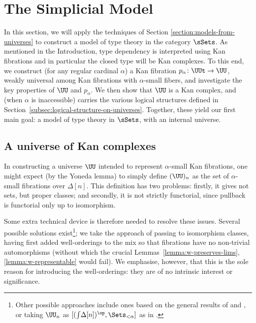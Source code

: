 \section{The Simplicial Model} \label{section:the-model}

In this section, we will apply the techniques of Section \ref{section:models-from-universes} to construct a model of type theory in the category $\sSets$. As mentioned in the Introduction, type dependency is interpreted using Kan fibrations and in particular the closed type will be Kan complexes. To this end, we construct (for any regular cardinal $\alpha$) a Kan fibration $p_\alpha \colon \UUt \to \UU$, weakly universal among Kan fibrations with $\alpha$-small fibers, and investigate the key properties of $\UU$ and $p_\alpha$. We then show that $\UU$ is a Kan complex, and (when $\alpha$ is inaccessible) carries the various logical structures defined in Section~\ref{subsec:logical-structure-on-universes}.  Together, these yield our first main goal: a model of type theory in $\sSets$, with an internal universe.

\subsection{A universe of Kan complexes} \label{subsec:representability-of-fibs}

In constructing a universe $\UU$ intended to represent $\alpha$-small Kan fibrations, one might expect (by the Yoneda lemma) to simply define $(\UU)_n$ as the set of $\alpha$-small fibrations over $\Delta[n]$.  This definition has two problems: firstly, it gives not sets, but proper classes; and secondly, it is not strictly functorial, since pullback is functorial only up to isomorphism.

Some extra technical device is therefore needed to resolve these issues.  Several possible solutions exist\footnote{Other possible approaches include ones based on the general results of \cite{hofmann:on-the-interpretation} and \cite{lumsdaine-warren:local-universes}, or taking $\UU_n$ as $[(\int\! \Delta[n])^\op, \Sets_{<\alpha}]$ as in \cite{hofmann-streicher:lifting-grothendieck-universes}.}; we take the approach of passing to isomorphism classes, having first added well-orderings to the mix so that fibrations have no non-trivial automorphisms (without which the crucial Lemmas~\ref{lemma:w-preserves-lims}, \ref{lemma:w-representable} would fail).  We emphasise, however, that this is the sole reason for introducing the well-orderings: they are of no intrinsic interest or significance. %

